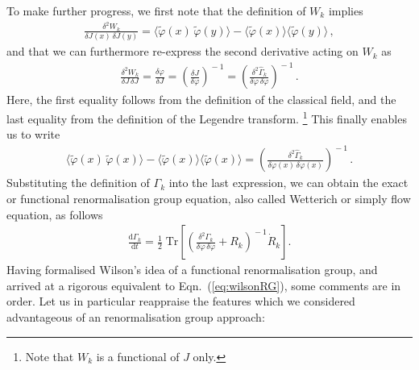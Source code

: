 \documentclass[11pt]{book}
\newcommand{\Tr}{\mathrm{Tr}}
\numberwithin{equation}{chapter}
\begin{document}
To make further progress, we
first note that the definition of $W_k$ implies
\begin{align}
  \frac{ \delta^2 W_k }{ \delta J(x) \, \delta J(y) }
  =
  \big\langle \tilde \varphi (x) \, \tilde \varphi (y) \big\rangle
  - \big\langle \tilde \varphi (x) \big\rangle \big\langle \tilde \varphi (y) \big\rangle \,,
\end{align}
and that we can furthermore re-express the second derivative
acting on $W_k$ as
\begin{align}
  \frac{ \delta^2 W_k }{ \delta J \, \delta J }
  = \frac{ \delta \varphi }{ \delta J }
  = \left( \frac{ \delta J }{ \delta \varphi } \right) ^{\!\! -1}
  = \left( \frac{ \delta^2 \hat \Gamma_k }{ \delta \varphi \, \delta \varphi } \right) ^{\!\! -1} \,.
\end{align}
Here, the first equality follows from the definition of the classical field,
and the last equality from the definition of the Legendre transform.%
\footnote{%
  Note that $W_k$ is a functional of $J$ only.
}
This finally enables us to write
\begin{align}
  \big\langle \tilde \varphi (x) \, \tilde \varphi (x) \big\rangle
  - \big\langle \tilde \varphi (x) \big\rangle \big\langle \tilde \varphi (x) \big\rangle
  = \left( \frac{ \delta^2 \hat \Gamma_k }{ \delta \varphi(x) \, \delta \varphi(x) } \right) ^{\!\! -1} \,.
\end{align}
Substituting the definition of $\Gamma_k$ into the last expression,
we can obtain the exact or functional renormalisation group equation,
also called Wetterich or simply flow equation, as follows
\begin{align}
    \frac{ \mathrm d \Gamma_k }{ \mathrm dt }
    = \frac 12 \; \Tr
    \left[
      \left(
        \frac{ \delta^2 \Gamma_k }{ \delta \varphi \, \delta \varphi } + R_k
      \right) ^{\!\!-1}
      \! \dot R_k
    \right] .
\end{align}
Having formalised Wilson's idea of a functional renormalisation group,
and arrived at a rigorous equivalent to Eqn.~(\ref{eq:wilsonRG}),
some comments are in order. Let us in particular reappraise the
features which we considered advantageous of an renormalisation group approach:
\bigskip
\end{document}
